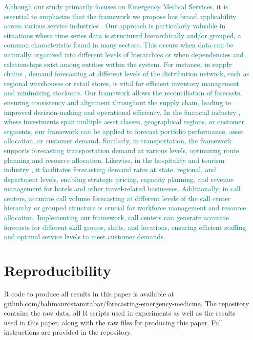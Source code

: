 \documentclass[
  authoryear,
  preprint,
  3p]{elsarticle}
\begin{document}
\textcolor{teal}{Although our study primarily focuses on Emergency Medical Services, it is essential to emphasize that the framework we propose has broad applicability across various service industries}
\citep{ostrom2010moving}.
\textcolor{teal}{Our approach is particularly valuable in situations where time series data is structured hierarchically and/or grouped, a common characteristic found in many sectors. This occurs when data can be naturally organized into different levels of hierarchies or when dependencies and relationships exist among entities within the system. For instance, in supply chains}
\citep{shugan2000advance},
\textcolor{teal}{demand forecasting at different levels of the distribution network, such as regional warehouses or retail stores, is vital for efficient inventory management and minimizing stockouts. Our framework allows the reconciliation of forecasts, ensuring consistency and alignment throughout the supply chain, leading to improved decision-making and operational efficiency. In the financial industry}
\citep{kimes1998strategic},
\textcolor{teal}{where investments span multiple asset classes, geographical regions, or customer segments, our framework can be applied to forecast portfolio performance, asset allocation, or customer demand. Similarly, in transportation, the framework supports forecasting transportation demand at various levels, optimizing route planning and resource allocation. Likewise, in the hospitality and tourism industry}
\citep{dekimpe2016impact},
\textcolor{teal}{it facilitates forecasting demand rates at state, regional, and department levels, enabling strategic pricing, capacity planning, and revenue management for hotels and other travel-related businesses. Additionally, in call centers, accurate call volume forecasting at different levels of the call center hierarchy or grouped structure is crucial for workforce management and resource allocation. Implementing our framework, call centers can generate accurate forecasts for different skill groups, shifts, and locations, ensuring efficient staffing and optimal service levels to meet customer demands.}

\section*{Reproducibility}\label{reproducibility}

R code to produce all results in this paper is available at
\href{https://github.com/bahmanrostamitabar/forecasting-emergency-medicine}{github.com/bahmanrostamitabar/forecasting-emergency-medicine}.
The repository contains the raw data, all R scripts used in experiments
as well as the results used in this paper, along with the raw files for
producing this paper. Full instructions are provided in the repository.


\renewcommand\refname{References}
  
\end{document}
